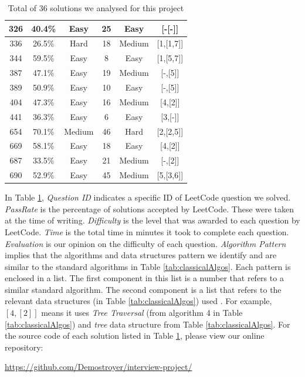 \documentclass[conference]{IEEEtran}
\begin{document}
\begin{table}
\begin{tabular}{|c| c| c| c| c| c|}
  	\hline
 	326 & 40.4\% &Easy  &25  &Easy&[-[-]]\\
   	\hline
  	336 & 26.5\% &Hard &18  &Medium&[1,[1,7]]\\
  	\hline
 	344 & 59.5\% &Easy  &8  &Easy&[1,[5,7]]\\
  	\hline
 	387 & 47.1\% &Easy  & 19 &Medium&[-,[5]]\\
  	\hline
 	389 & 50.9\% &Easy  & 10 &Easy& [-,[5]]\\
  	\hline
 	404 & 47.3\% &Easy  &16  &Medium&[4,[2]]\\
	\hline
 	441 & 36.3\% &Easy  &6&Easy &[3,[-]]\\ 	
  	\hline
 	654 & 70.1\% &Medium  &46  &Hard&[2,[2,5]]\\
  	\hline
	669 &  58.1\%& Easy &18  &Easy&[4,[2]]\\
  	\hline
	687 &  33.5\%& Easy &21  &Medium&[-,[2]]\\
  	\hline
 	690 &  52.9\%& Easy &   45&Medium&[5,[3,6]]\\[1ex]
 	\hline
\end{tabular}
\caption{Total of 36 solutions we analysed for this project}
\label{tab:tabSols}
\end{table}
\par In Table \ref{tab:tabSols}, \textit{Question ID} indicates a specific ID of LeetCode question we solved. \textit{PassRate} is the percentage of solutions accepted by LeetCode. These were taken at the time of writing. \textit{Difficulty} is the level that was awarded to each question by LeetCode. \textit{Time} is the total time in minutes it took to complete each question. \textit{Evaluation} is our opinion on the difficulty of each question. \textit{Algorithm Pattern} implies that the algorithms and data structures pattern we identify and are similar to the standard algorithms in Table \ref{tab:classicalAlgos}. Each pattern is enclosed in a list. The first component in this list is a number that refers to a similar standard algorithm. The second component is a list that refers to the relevant data structures (in Table \ref{tab:classicalAlgos}) used . For example, $[4,[2]]$ means it uses \textit{Tree Traversal} (from algorithm 4 in Table \ref{tab:classicalAlgos}) and \textit{tree} data structure from Table \ref{tab:classicalAlgos}. For the source code of each solution listed in Table \ref{tab:tabSols}, please view our online repository:
\begin{center}
\url{https://github.com/Demostroyer/interview-project/}
\end{center}
\end{document}
